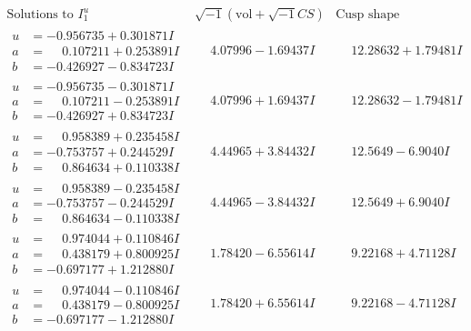 \documentclass[1p]{elsarticle_modified}
\theoremstyle{definition}
\newcommand{\I}{\sqrt{-1}}
\begin{document}
$$\begin{array}{c|c|c}  
\text{Solutions to }I^u_{1}& \I (\text{vol} + \sqrt{-1}CS) & \text{Cusp shape}\\
 \hline 
\begin{aligned}
u &= -0.956735 + 0.301871 I \\
a &= \phantom{-}0.107211 + 0.253891 I \\
b &= -0.426927 - 0.834723 I\end{aligned}
 & \phantom{-}4.07996 - 1.69437 I & \phantom{-}12.28632 + 1.79481 I \\ \hline\begin{aligned}
u &= -0.956735 - 0.301871 I \\
a &= \phantom{-}0.107211 - 0.253891 I \\
b &= -0.426927 + 0.834723 I\end{aligned}
 & \phantom{-}4.07996 + 1.69437 I & \phantom{-}12.28632 - 1.79481 I \\ \hline\begin{aligned}
u &= \phantom{-}0.958389 + 0.235458 I \\
a &= -0.753757 + 0.244529 I \\
b &= \phantom{-}0.864634 + 0.110338 I\end{aligned}
 & \phantom{-}4.44965 + 3.84432 I & \phantom{-}12.5649 - 6.9040 I \\ \hline\begin{aligned}
u &= \phantom{-}0.958389 - 0.235458 I \\
a &= -0.753757 - 0.244529 I \\
b &= \phantom{-}0.864634 - 0.110338 I\end{aligned}
 & \phantom{-}4.44965 - 3.84432 I & \phantom{-}12.5649 + 6.9040 I \\ \hline\begin{aligned}
u &= \phantom{-}0.974044 + 0.110846 I \\
a &= \phantom{-}0.438179 + 0.800925 I \\
b &= -0.697177 + 1.212880 I\end{aligned}
 & \phantom{-}1.78420 - 6.55614 I & \phantom{-}9.22168 + 4.71128 I \\ \hline\begin{aligned}
u &= \phantom{-}0.974044 - 0.110846 I \\
a &= \phantom{-}0.438179 - 0.800925 I \\
b &= -0.697177 - 1.212880 I\end{aligned}
 & \phantom{-}1.78420 + 6.55614 I & \phantom{-}9.22168 - 4.71128 I \\ \hline\begin{aligned}

\end{aligned}
\end{array}$$
\end{document}
